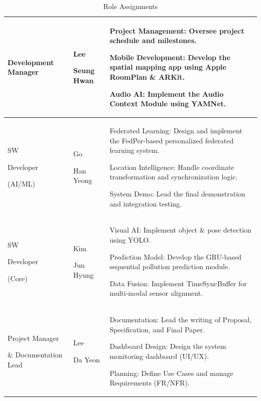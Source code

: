 \documentclass[conference]{IEEEtran}
\begin{document}
\begin{table}[h]
\caption{Role Assignments}
\def\arraystretch{1.24} \small

\begin{tabular}{|p{1.5cm}|p{1.2cm}|p{4.9cm}|}
    \hline
    Development Manager \par & Lee \par Seung Hwan & Project Management: Oversee project schedule and milestones. \par Mobile Development: Develop the spatial mapping app using Apple RoomPlan \& ARKit. \par Audio AI: Implement the Audio Context Module using YAMNet. \\
    \hline
    SW \par Developer \par (AI/ML) \par & Go  \par Han Yeong  & Federated Learning: Design and implement the FedPer-based personalized federated learning system. \par Location Intelligence: Handle coordinate transformation and synchronization logic. \par System Demo: Lead the final demonstration and integration testing. \\
    \hline
    SW \par Developer \par (Core) \par & Kim \par Jun Hyung & Visual AI: Implement object \& pose detection using YOLO. \par Prediction Model: Develop the GRU-based sequential pollution prediction module. \par Data Fusion: Implement TimeSyncBuffer for multi-modal sensor alignment. \\
    \hline
    Project Manager \par \& Documentation Lead \par & Lee \par Da Yeon & Documentation: Lead the writing of Proposal, Specification, and Final Paper. \par Dashboard Design: Design the system monitoring dashboard (UI/UX). \par Planning: Define Use Cases and manage Requirements (FR/NFR). \\
    \hline
\end{tabular}
\end{table}
\end{document}
